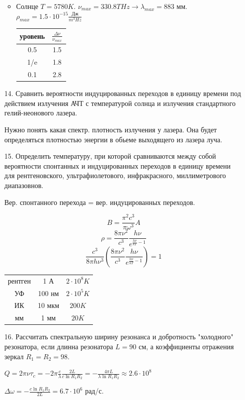 \documentclass[a4paper]{article}
\begin{document}
\begin{itemize}
\begin{itemize}
			\item Солнце $T=5780K$. $\nu_{max} = 330.8 THz \rightarrow \lambda_{max} = 883$ мм. $\rho_{max} = 1.5\cdot 10^{-15} \frac{\text{Дж}}{m^3 Hz}$ \par 
			\begin{center}
				\begin{tabular}{c|c}
					уровень & $\frac{\Delta \nu}{\nu_{max}} $ \\ \hline
					0.5 & 1.5 \\ 
					1/e & 1.8 \\ 
					0.1 & 2.8 \\ 
				\end{tabular}
			\end{center}
		\end{itemize}
		
	\item[14.] Сравнить вероятности индуцированных переходов в единицу времени под действием излучения АЧТ с температурой солнца и излучения стандартного гелий-неонового лазера. \par 
		Нужно понять какая спектр. плотность излучения у лазера. Она будет определяться плотностью энергии в обьеме выходящего из лазера луча.

	\item[15.] Определить температуру, при которой сравниваются между собой  вероятности спонтанных и индуцированных переходов в единицу времени для рентгеновского, ультрафиолетового, инфракрасного, миллиметрового диапазовнов. \par 
		Вер. спонтанного перехода = вер. индуцированных переходов. \par 
		$$B = \frac{\pi^2 c^3}{\pi \omega^3} A$$
		$$\rho = \frac{8 \pi \nu^2}{c^3} \frac{h \nu}{e^{\frac{h \nu}{kT} - 1}}$$
		$$\frac{c^3}{8 \pi h \nu^3} \left( \frac{8 \pi \nu^2}{c^3} \frac{h \nu}{e^{\frac{h \nu}{kT} - 1}} \right) = 1$$

		\begin{center}
			\begin{tabular}{c|c|c}
				\hline
				рентген & 1 А & $2 \cdot 10^8 K$ \\ 
				УФ & 100 нм & $2 \cdot 10^5 K$ \\ 
				ИК & 10 мкм & $200K$ \\ 
				мм & 1 мм & $20K$ \\ 
			\end{tabular}
		\end{center}

	\item[16.] Рассчитать спектральную ширину резонанса и добротность "холодного" резонатора, если длинна резонатора $L=90$ см, а коэффициенты отражения зеркал $R_1=R_2=98$. \par 
		$Q = 2 \pi \nu \tau_c = -2 \pi \frac{c}{\lambda} \frac{2 L}{c \ln{R_1R_2}} = -\frac{4 \pi L}{\lambda \ln{R_1R_2}} \approx 2.6 \cdot 10^8$ \par 
		$\Delta \omega = -\frac{c \ln{R_1R_2}}{2 L} = 6.7 \cdot 10^6$ рад/с.


\end{itemize}
\end{document}
